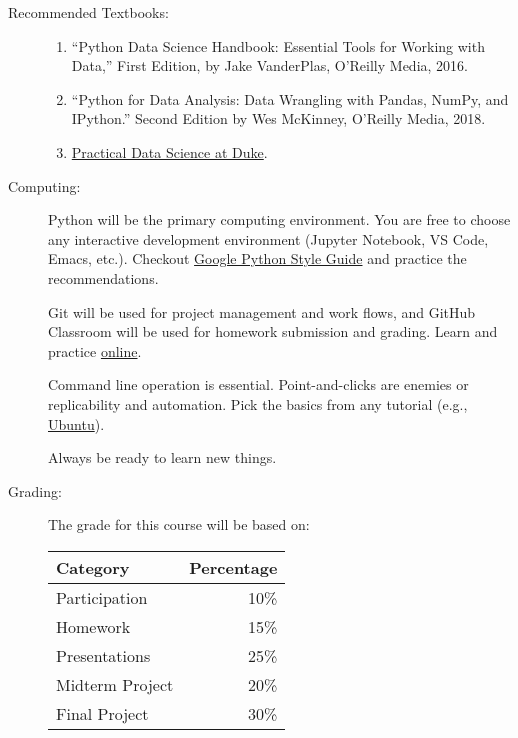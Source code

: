 \documentclass[twocolumn]{article}
\let\proglang=\textsf
\begin{document}
\begin{description}
\item[Recommended Textbooks:]\hspace{0pt}
  \begin{enumerate}
  \item 
    ``Python Data Science Handbook: Essential Tools for Working with
    Data,'' First Edition, by Jake VanderPlas, O’Reilly Media, 2016.
 
  \item
    ``Python for Data Analysis: Data Wrangling with Pandas, NumPy, and
    IPython.''  Second Edition by Wes McKinney, O’Reilly Media, 2018.
  \item
    \href{https://www.practicaldatascience.org/html/not_a_mids_student.html}{Practical
    Data Science at Duke}.
  \end{enumerate}

\item[Computing:]
  \proglang{Python} will be the primary computing environment. You are
  free to choose any interactive development environment (Jupyter
  Notebook, VS Code, Emacs, etc.). Checkout
  \href{https://google.github.io/styleguide/pyguide.html}{Google
  Python Style Guide} and practice the recommendations.

  Git will be used for project management and work flows, and GitHub
  Classroom will be used for homework submission and grading. Learn
  and practice \href{https://gitexercises.fracz.com}{online}.

  Command line operation is essential. Point-and-clicks are enemies or
  replicability and automation. Pick the basics from any tutorial
  (e.g.,
  \href{https://ubuntu.com/tutorials/command-line-for-beginners}{Ubuntu}).

  Always be ready to learn new things.

\item[Grading:]
The grade for this course will be based on:
\begin{center}
  \begin{tabular}{lr}
    \toprule
    Category                & Percentage\\
    \midrule
    Participation           &  10\% \\
    Homework              &  15\% \\
    Presentations          &  25\% \\
    Midterm Project      &  20\% \\
    Final Project            & 30\% \\
    \bottomrule
  \end{tabular}
\end{center} 


\end{description}
\end{document}
